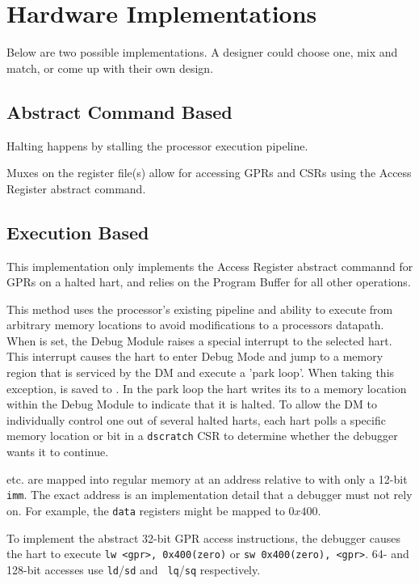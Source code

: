 \chapter{Hardware Implementations}
\label{sec:implementations}

Below are two possible implementations. A designer could choose one, mix and
match, or come up with their own design.

\section{Abstract Command Based}

Halting happens by stalling the processor execution pipeline.

Muxes on the register file(s) allow for accessing GPRs and CSRs
using the Access Register abstract command.

\section{Execution Based}

This implementation only implements the Access Register abstract commannd
for GPRs on a halted hart, and relies on the Program Buffer for all other
operations.

This method uses the processor's existing pipeline
and ability to execute from arbitrary memory locations to avoid
modifications to a processors datapath.
When \Fhaltreq is set, the Debug Module raises a special interrupt
to the selected hart. This interrupt causes the
hart to enter Debug Mode and jump to a 
memory region that is serviced by the DM and execute a 'park loop'.
When taking this exception, \Rpc is saved to \Rdpc.
In
the park loop the hart writes its \Rmhartid to a memory location within the Debug
Module to indicate that it is halted.
To allow the DM to individually control one out of several
halted harts, each hart polls a specific memory location or bit in a {\tt dscratch}
CSR to determine whether the debugger wants it to continue.

\Rdatazero etc. are mapped into regular memory at an address relative to \Rzero
with only a 12-bit {\tt imm}. The exact address is an implementation
detail that a debugger must not rely on. For example, the {\tt data}
registers might be mapped to $0x400$.

To implement the abstract 32-bit GPR access instructions, the debugger causes
the hart to  execute {\tt lw <gpr>, 0x400(zero)} or {\tt sw 0x400(zero), <gpr>}.
64- and 128-bit accesses use {\tt ld}/{\tt sd} and {\tt
lq}/{\tt sq} respectively.

